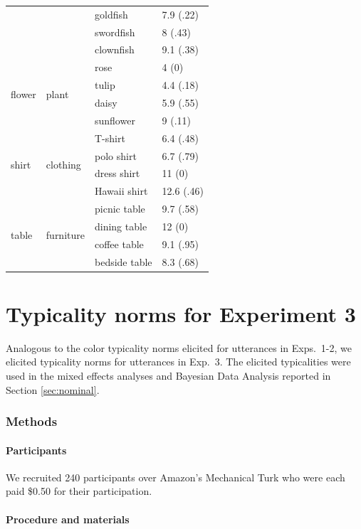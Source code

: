 \documentclass[11pt]{article}
\newcommand{\sectionref}[1]{Section \ref{#1}}
\begin{document}
\begin{table}
\begin{tabular}{l l l l}
		& & goldfish & 7.9 (.22)\\
		& & swordfish & 8 (.43)\\
		& & clownfish & 9.1 (.38)\\
	\midrule
	\multirow{4}{*}{flower} & \multirow{4}{*}{plant} & rose & 4 (0)\\
		& & tulip & 4.4 (.18)\\
		& & daisy & 5.9 (.55)\\
		& & sunflower & 9 (.11)\\
	\midrule
	\multirow{4}{*}{shirt} & \multirow{4}{*}{clothing} & T-shirt & 6.4 (.48)\\
		& & polo shirt & 6.7 (.79)\\
		& & dress shirt & 11 (0)\\
		& & Hawaii shirt & 12.6 (.46)\\
	\midrule
	\multirow{4}{*}{table} & \multirow{4}{*}{furniture} & picnic table & 9.7 (.58)\\
		& & dining table & 12 (0)\\
		& & coffee table & 9.1 (.95)\\
		& & bedside table & 8.3 (.68)\\				
	\bottomrule
	\end{tabular}
	\label{tab:exp3items}
\end{table}


\section{Typicality norms for Experiment 3}
\label{app:typicalitynorms2}

Analogous to the color typicality norms elicited for utterances in Exps.~1-2, we elicited typicality norms for utterances in Exp.~3. The elicited typicalities were used in the mixed effects analyses and Bayesian Data Analysis reported in \sectionref{sec:nominal}.

\subsubsection{Methods}

\paragraph{Participants}

We recruited 240 participants over Amazon's Mechanical Turk who were each paid \$0.50 for their participation.

\paragraph{Procedure and materials}
\end{document}
